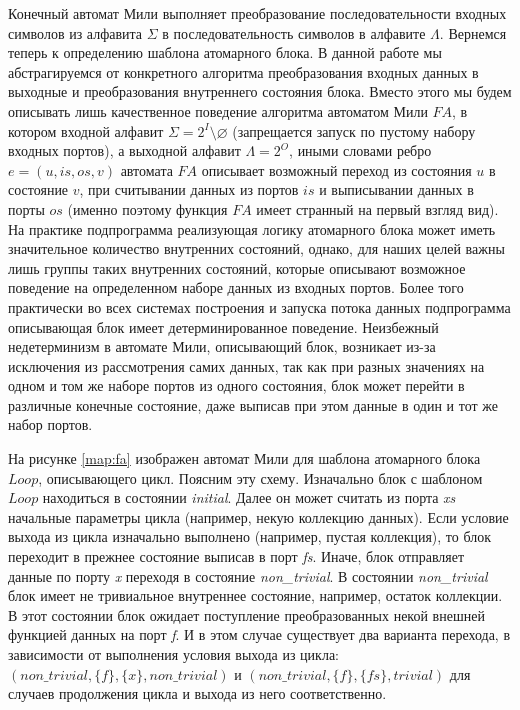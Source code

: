 \documentclass[10pt,a4paper]{article}
\newcommand{\FA}{F\!A}
\begin{document}
Конечный автомат Мили выполняет преобразование последовательности входных символов из алфавита $\Sigma$ в последовательность символов в алфавите $\Lambda$.
Вернемся теперь к определению шаблона атомарного блока. В данной работе мы абстрагируемся от конкретного алгоритма преобразования входных данных в выходные
и преобразования внутреннего состояния блока. Вместо этого мы будем описывать лишь качественное поведение алгоритма автоматом Мили $\FA$, в котором входной алфавит
$\Sigma = 2^I \setminus \varnothing$ (запрещается запуск по пустому набору входных портов),
а выходной алфавит $\Lambda = 2^O$, иными словами ребро $e = (u, is, os, v)$ автомата $\FA$ описывает возможный переход из состояния $u$ в состояние $v$,
при считывании данных из портов $is$ и выписывании данных в порты $os$ (именно поэтому функция $\FA$ имеет странный на первый взгляд вид).
На практике подпрограмма реализующая логику атомарного блока может иметь значительное количество внутренних состояний,
однако, для наших целей важны лишь группы таких внутренних состояний, которые описывают возможное поведение на определенном наборе данных из входных портов.
Более того практически во всех системах построения и запуска потока данных подпрограмма описывающая блок имеет детерминированное поведение.
Неизбежный недетерминизм в автомате Мили, описывающий блок, возникает из-за исключения из рассмотрения самих данных,
так как при разных значениях на одном и том же наборе портов из одного состояния, блок может перейти в различные конечные состояние,
даже выписав при этом данные в один и тот же набор портов.

На рисунке \ref{map:fa} изображен автомат Мили для шаблона атомарного блока $Loop$, описывающего цикл. Поясним эту схему.
Изначально блок с шаблоном $Loop$ находиться в состоянии \textit{initial}.
Далее он может считать из порта \textit{xs} начальные параметры цикла (например, некую коллекцию данных).
Если условие выхода из цикла изначально выполнено (например, пустая коллекция), то блок переходит в прежнее состояние выписав в порт \textit{fs}.
Иначе, блок отправляет данные по порту \textit{x} переходя в состояние \textit{non\_trivial}. В состоянии \textit{non\_trivial} блок имеет не тривиальное внутреннее состояние,
например, остаток коллекции. В этот состоянии блок ожидает поступление преобразованных некой внешней функцией данных на порт \textit{f}.
И в этом случае существует два варианта перехода, в зависимости от выполнения условия выхода из цикла:
$(non\_trivial, \{f\}, \{x\}, non\_trivial)$ и $(non\_trivial, \{f\}, \{fs\}, trivial)$ для случаев продолжения цикла и выхода из него соответственно.
\end{document}
